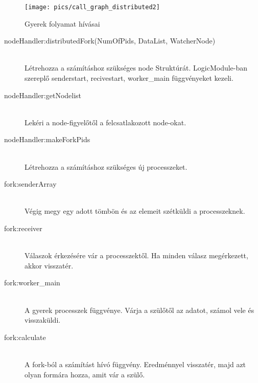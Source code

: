 	\begin{figure}[h]
		\texttt{[image: pics/call\_graph\_distributed2]}
		\centering
		\caption{Gyerek folyamat hívásai\label{fig:call_graph_distributed2}}
	\end{figure}
	
	\begin{description}
		\item[nodeHandler:distributedFork(NumOfPids, DataList, WatcherNode)]
		\hfill \\
		Létrehozza a számításhoz szükséges node Struktúrát.
		LogicModule-ban szereplő senderstart, recivestart, worker\_main függvényeket kezeli.
		\item[nodeHandler:getNodelist]
		\hfill \\
		Lekéri a node-figyelőtől a felcsatlakozott node-okat.
		\item[nodeHandler:makeForkPids]
		\hfill \\
		Létrehozza a számításhoz szükséges új processzeket.

		\item[fork:senderArray]
		\hfill \\ 
			Végig megy egy adott tömbön és az elemeit szétküldi a processzeknek. 
		\item[fork:receiver]
		\hfill \\
			Válaszok érkezésére vár a processzektől. Ha minden válasz megérkezett, akkor visszatér.
		\item[fork:worker\_main]
		\hfill \\
			A gyerek processzek függvénye. Várja a szülőtől az adatot, számol vele és visszaküldi.
		\item[fork:calculate]
		\hfill \\ 
			A fork-ból a számítást hívó függvény. Eredménnyel visszatér, majd azt olyan formára hozza, amit vár a szülő. 
	\end{description}